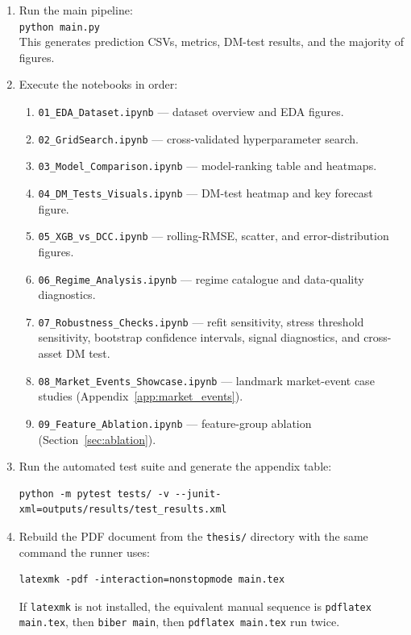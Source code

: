 \begin{enumerate}[topsep=4pt, itemsep=3pt, parsep=0pt]
    \item Run the main pipeline:\\
          \texttt{python main.py}\\
          This generates prediction CSVs, metrics, DM-test results, and the majority of figures.
    \item Execute the notebooks in order:
    \begin{enumerate}[topsep=2pt, itemsep=1pt, parsep=0pt]
        \item \texttt{01\_EDA\_Dataset.ipynb} --- dataset overview and EDA figures.
        \item \texttt{02\_GridSearch.ipynb} --- cross-validated hyperparameter search.
        \item \texttt{03\_Model\_Comparison.ipynb} --- model-ranking table and heatmaps.
        \item \texttt{04\_DM\_Tests\_Visuals.ipynb} --- DM-test heatmap and key forecast figure.
        \item \texttt{05\_XGB\_vs\_DCC.ipynb} --- rolling-RMSE, scatter, and error-distribution figures.
        \item \texttt{06\_Regime\_Analysis.ipynb} --- regime catalogue and data-quality diagnostics.
        \item \texttt{07\_Robustness\_Checks.ipynb} --- refit sensitivity, stress threshold sensitivity, bootstrap confidence intervals, signal diagnostics, and cross-asset DM test.
        \item \texttt{08\_Market\_Events\_Showcase.ipynb} --- landmark market-event case studies (Appendix~\ref{app:market_events}).
        \item \texttt{09\_Feature\_Ablation.ipynb} --- feature-group ablation (Section~\ref{sec:ablation}).
    \end{enumerate}
    \item Run the automated test suite and generate the appendix table:
\begin{lstlisting}[language={}, aboveskip=3pt, belowskip=3pt]
python -m pytest tests/ -v --junit-xml=outputs/results/test_results.xml
\end{lstlisting}
    \item Rebuild the PDF document from the \texttt{thesis/} directory with the same command the runner uses:
\begin{lstlisting}[language={}, aboveskip=3pt, belowskip=3pt]
latexmk -pdf -interaction=nonstopmode main.tex
\end{lstlisting}
    If \texttt{latexmk} is not installed, the equivalent manual sequence is \texttt{pdflatex main.tex}, then \texttt{biber main}, then \texttt{pdflatex main.tex} run twice.
\end{enumerate}

